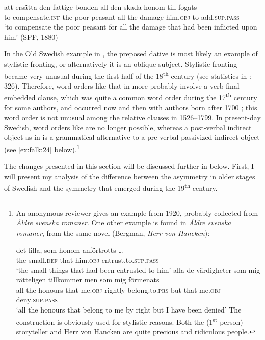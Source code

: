 \documentclass[output=paper]{langscibook}
\begin{document}
\ex\label{ex:falk:22d}
\gll att    ersätta        den  fattige  bonden    all  den  skada    honom till-fogats\\
      to    compensate.\textsc{inf}  the  poor    peasant  all  the  damage  him.\textsc{obj}         to-add\textsc{.sup.pass}\\
\glt ‘to compensate the poor peasant for all the damage that had been inflicted upon       him’ (SPF, 1880)
\z
\z

In the Old Swedish example in , the preposed dative is most likely an example of stylistic fronting, or alternatively it is an oblique subject. Stylistic fronting became very unusual during the first half of the 18\textsuperscript{th} century (see statistics in \citealt{Falk1993}: 326). Therefore, word orders like that in  more probably involve a verb-final embedded clause, which was quite a common word order during the 17\textsuperscript{th} century for some authors, and occurred now and then with authors born after 1700 \citep{Platzack1983}; this word order is not unusual among the relative clauses in 1526–1799. In present-day Swedish, word orders like  are no longer possible, whereas a post-verbal indirect object as in  is a grammatical alternative to a pre-verbal passivized indirect object (see \ref{ex:falk:24} below).\footnote{An anonymous reviewer gives an example from 1920, probably collected from \textit{Äldre svenska romaner}. One other example is found in \textit{Äldre svenska romaner}, from the same novel (Bergman, \textit{Herr von Hancken}):

\ea \gll det  lilla,    som  honom    anförtrotts …\\
        the  small.\textsc{def}  that  him.\textsc{obj}  entrust.to.\textsc{sup.pass}\\
        \glt  ‘the small things that had been entrusted to him’
\ex  \gll alla de  värdigheter  som  mig    rätteligen  tillkommer    men  som  mig    förmenats\\
         all the  honours    that  me.\textsc{obj}  rightly    belong.to.\textsc{prs}  but  that  me.\textsc{obj}  deny\textsc{.sup.pass}\\
       \glt ‘all the honours that belong to me by right but I have been denied’
\z The construction is obviously used for stylistic reasons. Both the (1\textsuperscript{st} person) storyteller and Herr von Hancken are quite precious and ridiculous people.}


The changes presented in this section will be discussed further in  below. First, I will present my analysis of the difference between the asymmetry in older stages of Swedish and the symmetry that emerged during the 19\textsuperscript{th} century.
\end{document}
